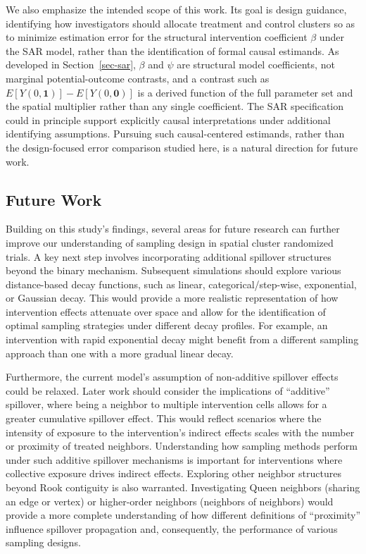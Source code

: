 \documentclass[
  12pt,
  prelim]{bios-prelim}
\begin{document}
We also emphasize the intended scope of this work. Its goal is design
guidance, identifying how investigators should allocate treatment and
control clusters so as to minimize estimation error for the structural
intervention coefficient \(\beta\) under the SAR model, rather than the
identification of formal causal estimands. As developed in
Section~\ref{sec-sar}, \(\beta\) and \(\psi\) are structural model
coefficients, not marginal potential-outcome contrasts, and a contrast
such as \(E[Y(0,\mathbf{1})] -
E[Y(0,\mathbf{0})]\) is a derived function of the full parameter set and
the spatial multiplier rather than any single coefficient. The SAR
specification could in principle support explicitly causal
interpretations under additional identifying assumptions. Pursuing such
causal-centered estimands, rather than the design-focused error
comparison studied here, is a natural direction for future work.

\subsection{Future Work}\label{sec-future-considerations}

Building on this study's findings, several areas for future research can
further improve our understanding of sampling design in spatial cluster
randomized trials. A key next step involves incorporating additional
spillover structures beyond the binary mechanism. Subsequent simulations
should explore various distance-based decay functions, such as linear,
categorical/step-wise, exponential, or Gaussian decay. This would
provide a more realistic representation of how intervention effects
attenuate over space and allow for the identification of optimal
sampling strategies under different decay profiles. For example, an
intervention with rapid exponential decay might benefit from a different
sampling approach than one with a more gradual linear decay.

Furthermore, the current model's assumption of non-additive spillover
effects could be relaxed. Later work should consider the implications of
``additive'' spillover, where being a neighbor to multiple intervention
cells allows for a greater cumulative spillover effect. This would
reflect scenarios where the intensity of exposure to the intervention's
indirect effects scales with the number or proximity of treated
neighbors. Understanding how sampling methods perform under such
additive spillover mechanisms is important for interventions where
collective exposure drives indirect effects. Exploring other neighbor
structures beyond Rook contiguity is also warranted. Investigating Queen
neighbors (sharing an edge or vertex) or higher-order neighbors
(neighbors of neighbors) would provide a more complete understanding of
how different definitions of ``proximity'' influence spillover
propagation and, consequently, the performance of various sampling
designs.
\end{document}
